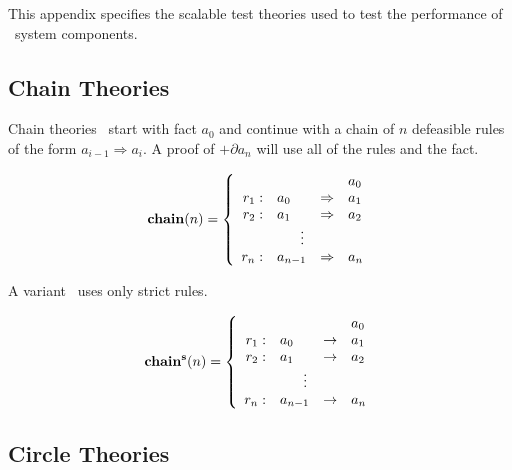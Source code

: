 

{

   \setlength{\arraycolsep}{0.25em}

This appendix specifies the scalable test theories
used to test the performance of \deimos\ system
components.

\subsection{Chain Theories} %

\label{chainTheories}

Chain theories \chainTh\ start with
fact $a_{0}$ and continue 
with a chain of $n$ defeasible rules of the form
$a_{i-1} \Rightarrow a_{i}$. 
A proof of $+\partial a_{n}$ will use all of the
rules and the fact.

\[\mathbf{chain}(n) = \left\{
\begin{array}{rlll}
       &           & &          a_{0} \\
r_{1}: & a_{0}  & \Rightarrow & a_{1} \\
r_{2}: & a_{1}  & \Rightarrow & a_{2} \\
\multicolumn{4}{c}{\vdots}          \\
r_{n}: & a_{n-1} & \Rightarrow & a_{n}
\end{array}\right. \]

A variant \chainSTh\ uses only strict rules.

\[\mathbf{chain^{s}}(n) = \left\{
\begin{array}{rlll}
       &        & &             a_{0} \\
r_{1}: & a_{0} &  \rightarrow & a_{1} \\
r_{2}: & a_{1} &  \rightarrow & a_{2} \\
\multicolumn{4}{c}{\vdots}          \\
r_{n}: & a_{n-1} & \rightarrow & a_{n}
\end{array}\right. \]



\subsection{Circle Theories} %

}
